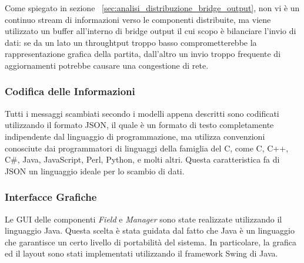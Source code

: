 Come spiegato in sezione ~\ref{sec:analisi_distribuzione_bridge_output}, non vi \`{e} un continuo stream di informazioni verso le componenti distribuite, ma viene utilizzato un buffer all'interno di bridge output il cui scopo \`{e} bilanciare l'invio di dati: se da un lato un throughtput troppo basso comprometterebbe la rappresentazione grafica della partita, dall'altro un invio troppo frequente di aggiornamenti potrebbe causare una congestione di rete.

\subsubsection{Codifica delle Informazioni}
Tutti i messaggi scambiati secondo i modelli appena descritti sono codificati utilizzando il formato JSON, il quale \`{e} un formato di testo completamente indipendente dal linguaggio di programmazione, ma utilizza convenzioni conosciute dai programmatori di linguaggi della famiglia del C, come C, C++, C\#, Java, JavaScript, Perl, Python, e molti altri. Questa caratteristica fa di JSON un linguaggio ideale per lo scambio di dati.

\subsubsection{Interfacce Grafiche}
Le GUI delle componenti \emph{Field} e \emph{Manager} sono state realizzate utilizzando il linguaggio Java. Questa scelta \`{e} stata guidata dal fatto che Java \`{e} un linguaggio che garantisce un certo livello di portabilit\`{a} del sistema. In particolare, la grafica ed il layout sono stati implementati utilizzando il framework Swing di Java.